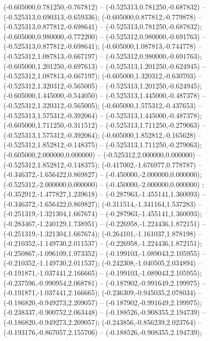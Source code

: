  (-0.605000,0.781250,-0.767812) -- (-0.525313,0.781250,-0.687832) -- (-0.525313,0.690313,-0.659336);
 (-0.605000,0.877812,-0.779878) -- (-0.525313,0.877812,-0.698641) -- (-0.525313,0.781250,-0.687832);
 (-0.605000,0.980000,-0.772200) -- (-0.525312,0.980000,-0.691763) -- (-0.525313,0.877812,-0.698641);
 (-0.605000,1.087813,-0.744778) -- (-0.525312,1.087813,-0.667197) -- (-0.525312,0.980000,-0.691763);
 (-0.605000,1.201250,-0.697613) -- (-0.525313,1.201250,-0.624945) -- (-0.525312,1.087813,-0.667197);
 (-0.605000,1.320312,-0.630703) -- (-0.525312,1.320312,-0.565005) -- (-0.525313,1.201250,-0.624945);
 (-0.605000,1.445000,-0.544050) -- (-0.525313,1.445000,-0.487378) -- (-0.525312,1.320312,-0.565005);
 (-0.605000,1.575312,-0.437653) -- (-0.525313,1.575312,-0.392064) -- (-0.525313,1.445000,-0.487378);
 (-0.605000,1.711250,-0.311512) -- (-0.525313,1.711250,-0.279063) -- (-0.525313,1.575312,-0.392064);
 (-0.605000,1.852812,-0.165628) -- (-0.525312,1.852812,-0.148375) -- (-0.525313,1.711250,-0.279063);
 (-0.605000,2.000000,0.000000) -- (-0.525312,2.000000,0.000000) -- (-0.525312,1.852812,-0.148375);
 (-0.417002,-1.676977,0.778787) -- (-0.346372,-1.656422,0.869827) -- (-0.450000,-2.000000,0.000000);
 (-0.525312,-2.000000,0.000000) -- (-0.450000,-2.000000,0.000000) ;
 (-0.352912,-1.477827,1.239618) -- (-0.287963,-1.455141,1.360093) -- (-0.346372,-1.656422,0.869827);
 (-0.311514,-1.341164,1.537283) -- (-0.251319,-1.321304,1.667674) -- (-0.287963,-1.455141,1.360093);
 (-0.283467,-1.240129,1.738951) -- (-0.226958,-1.224436,1.872151) -- (-0.251319,-1.321304,1.667674);
 (-0.264101,-1.161037,1.878198) -- (-0.210352,-1.149730,2.011537) -- (-0.226958,-1.224436,1.872151);
 (-0.250867,-1.096109,1.973352) -- (-0.199103,-1.089043,2.105955) -- (-0.210352,-1.149730,2.011537);
 (-0.242308,-1.040505,2.034894) -- (-0.191871,-1.037441,2.166665) -- (-0.199103,-1.089043,2.105955);
 (-0.237596,-0.990954,2.068781) -- (-0.187902,-0.991649,2.199975) -- (-0.191871,-1.037441,2.166665);
 (-0.236309,-0.945035,2.078034) -- (-0.186820,-0.949273,2.209057) -- (-0.187902,-0.991649,2.199975);
 (-0.238337,-0.900752,2.063448) -- (-0.188526,-0.908355,2.194739) -- (-0.186820,-0.949273,2.209057);
 (-0.243856,-0.856239,2.023764) -- (-0.193176,-0.867057,2.155706) -- (-0.188526,-0.908355,2.194739);
